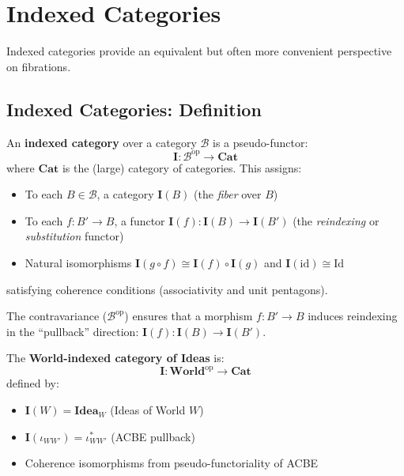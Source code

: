 \section{Indexed Categories}
\label{sec:indexed-categories}

Indexed categories provide an equivalent but often more convenient
perspective on fibrations.

\subsection{Indexed Categories: Definition}
\label{subsec:indexed-categories-def}

\begin{definition}
\label{def:indexed-category}
An \textbf{indexed category} over a category $\mathcal{B}$ is a pseudo-functor:
\[
  \mathbf{I} : \mathcal{B}^{\mathrm{op}} \longrightarrow \mathbf{Cat}
\]
where $\mathbf{Cat}$ is the (large) category of categories. This assigns:
\begin{itemize}
  \item To each $B \in \mathcal{B}$, a category $\mathbf{I}(B)$ (the \emph{fiber} over $B$)
  \item To each $f : B' \to B$, a functor $\mathbf{I}(f) : \mathbf{I}(B) \to \mathbf{I}(B')$
        (the \emph{reindexing} or \emph{substitution} functor)
  \item Natural isomorphisms $\mathbf{I}(g \circ f) \cong \mathbf{I}(f) \circ \mathbf{I}(g)$
        and $\mathbf{I}(\mathrm{id}) \cong \mathrm{Id}$
\end{itemize}
satisfying coherence conditions (associativity and unit pentagons).
\end{definition}

\begin{remark}[Contravariance]
The contravariance ($\mathcal{B}^{\mathrm{op}}$) ensures that a morphism
$f : B' \to B$ induces reindexing in the ``pullback'' direction:
$\mathbf{I}(f) : \mathbf{I}(B) \to \mathbf{I}(B')$.
\end{remark}

\begin{definition}
\label{def:world-indexed-ideas}
The \textbf{World-indexed category of Ideas} is:
\[
  \mathbf{I} : \mathbf{World}^{\mathrm{op}} \longrightarrow \mathbf{Cat}
\]
defined by:
\begin{itemize}
  \item $\mathbf{I}(W) = \mathbf{Idea}_W$ (Ideas of World $W$)
  \item $\mathbf{I}(\iota_{WW'}) = \iota_{WW'}^*$ (ACBE pullback)
  \item Coherence isomorphisms from pseudo-functoriality of ACBE
\end{itemize}
\end{definition}

